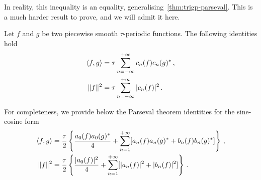 In reality, this inequality is an equality, generalising~\cref{thm:trigp-parseval}. This is a much harder result to prove, and we will admit it here.
\begin{theorem}[Parseval]
  \label{thm:parseval}
  Let $f$ and $g$ be two piecewise smooth $\tau$-periodic functions. The following identities hold
  \begin{align}
    \braket{f,g}&=\tau\sum_{n=-\infty}^{+\infty}c_n(f)c_n(g)^*\,,
    \label{eq:fs-dot}\\
    \|f\|^2&=\tau\sum_{n=-\infty}^{+\infty}|c_n(f)|^2\,.
    \label{eq:fs-norm}
  \end{align}
\end{theorem}
For completeness, we provide below the Parseval theorem identities for the sine-cosine form
\begin{align}
  \braket{f,g}&=\frac{\tau}{2}\left\{\frac{a_0(f)a_0(g)^*}{4}
  +\sum_{n=1}^{+\infty}[a_n(f)a_n(g)^*+b_n(f)b_n(g)^*]\right\}\,,\\
  \|f\|^2&=\frac{\tau}{2}\left\{\frac{|a_0(f)|^2}{4}+\sum_{n=1}^{+\infty}[|a_n(f)|^2+|b_n(f)|^2]\right\}\,.
\end{align}
